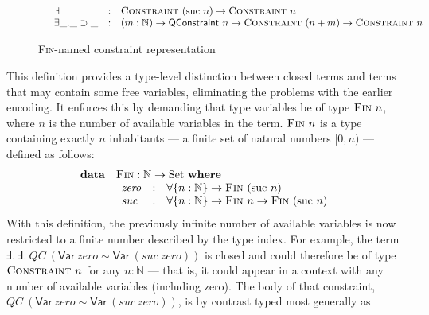 \documentclass[a4paper]{jfp}
\begin{document}
\begin{figure}[H]
\begin{displaymath}
\begin{array}{l}
\begin{array}{l}
\begin{array}{lcl}
						 \Finv    & : & \textsc{Constraint}\ (\text{suc}\ n) \rightarrow \textsc{Constraint}\ n \\
                   \exists\_.\_\supset\_ & : & (m : \mathbb{N}) \rightarrow \textsf{QConstraint}\ n \rightarrow \textsc{Constraint}\ (n + m)
          \rightarrow \textsc{Constraint}\ n
					    \end{array} \\
     \end{array}
   \end{array}
\end{displaymath}
\caption{\textsc{Fin}-named constraint representation}
\end{figure}

This definition provides a type-level distinction between closed terms and terms that may contain some free variables, eliminating the problems with
the earlier encoding. It enforces this by demanding that type variables be of type $\textsc{Fin}\ n$, where $n$ is the number of available variables
in the term. $\textsc{Fin}\ n$ is a type containing exactly $n$ inhabitants --- a finite set of natural numbers $[0,n)$ --- defined as follows:
\nopagebreak
\begin{displaymath}   
	\begin{array}{ll}
		\textbf{data} & \textsc{Fin} : \mathbb{N} \rightarrow \text{Set}\ \textbf{where} \\
		              & \begin{array}{lcl}
                         \mathit{zero} & : & \forall \{ n : \mathbb{N} \} \rightarrow \textsc{Fin}\ (\text{suc}\ n)\\
                         \mathit{suc}  & : & \forall \{ n : \mathbb{N} \} \rightarrow \textsc{Fin}\ n \rightarrow \textsc{Fin}\ (\text{suc}\ n)\\
			  		       \end{array}
     \end{array}
\end{displaymath}	 
With this definition, the previously infinite number of available variables is now restricted to a finite number described by the type index. For
example, the term $\Finv.\ \Finv.\ \mathit{QC}\ (\textsf{Var}\ \mathit{zero} \sim \textsf{Var}\ (\mathit{suc}\ \mathit{zero}))$  is closed and could therefore be of type 
$\textsc{Constraint}\ n$ for any $n : \mathbb{N}$ --- that is, it could appear in a context with any number of available variables (including
zero). The body of that constraint, $\mathit{QC}\ (\textsf{Var}\ \mathit{zero} \sim \textsf{Var}\ (\mathit{suc}\ \mathit{zero}))$, is by contrast typed most generally as 
\end{document}
